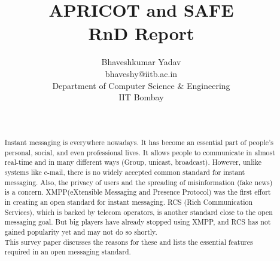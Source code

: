 \documentclass[11pt, conference, a4paper]{IEEEtran}
\begin{document}
\title{APRICOT and SAFE\\
RnD Report
}
\author{
\author{
\begin{tabular}{c}  {Bhaveshkumar Yadav} \\ bhaveshy@iitb.ac.in \\Department of Computer Science \& Engineering \\ IIT Bombay \end{tabular} }
\\
\mbox{}

}

\maketitle
\begin{abstract}
  Instant messaging is everywhere nowadays. It has become an essential part of people's personal, social, and even professional lives. It allows people to communicate in almost real-time and in many different ways (Group, unicast, broadcast). However, unlike systems like e-mail, there is no widely accepted common standard for instant messaging. Also, the privacy of users and the spreading of misinformation (fake news) is a concern. XMPP(eXtensible Messaging and Presence Protocol) was the first effort in creating an open standard for instant messaging. RCS (Rich Communication Services), which is backed by telecom operators, is another standard close to the open messaging goal. But big players have already stopped using XMPP, and RCS has not gained popularity yet and may not do so shortly. \\
  This survey paper discusses the reasons for these and lists the essential features required in an open messaging standard. 
\end{abstract}
\end{document}
